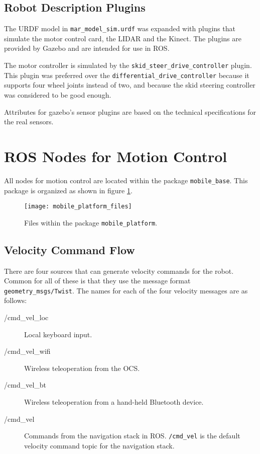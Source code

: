 \subsection{Robot Description Plugins}

The \ac{URDF} model in \texttt{mar\_model\_sim.urdf} was expanded with plugins that simulate the motor control card, the \ac{LIDAR} and the Kinect. The plugins are provided by Gazebo and are intended for use in \ac{ROS}. 

The motor controller is simulated by the \texttt{skid\_steer\_drive\_controller} plugin. This plugin was preferred over the \texttt{differential\_drive\_controller} because it supports four wheel joints instead of two, and because the skid steering controller was considered to be good enough. 

Attributes for gazebo's sensor plugins are based on the technical specifications\cite{hokuyo_spec} for the real sensors. 

\section{ROS Nodes for Motion Control}
\label{sec:control}
All nodes for motion control are located within the package \texttt{mobile\_base}. This package is organized as shown in figure \ref{fig:mobile_platform_files}.

\begin{figure}[h]
	\centering
	\texttt{[image: mobile\_platform\_files]}
	\caption{Files within the package \texttt{mobile\_platform}.}
	\label{fig:mobile_platform_files}
\end{figure}

\subsection{Velocity Command Flow}

There are four sources that can generate velocity commands for the robot. Common for all of these is that they use the message format \texttt{geometry\_msgs/Twist}. The names for each of the four velocity messages are as follows:

\begin{description}
	\item[/cmd\_vel\_loc] Local keyboard input.
	\item[/cmd\_vel\_wifi] Wireless teleoperation from the \ac{OCS}.
	\item[/cmd\_vel\_bt] Wireless teleoperation from a hand-held Bluetooth device.
	\item[/cmd\_vel] Commands from the navigation stack in \ac{ROS}. \texttt{/cmd\_vel} is the default \: \: velocity command topic for the navigation stack.
\end{description}

